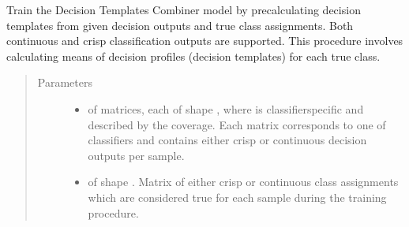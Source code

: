 \documentclass[letterpaper,10pt,english]{sphinxmanual}
\begin{document}
\begin{fulllineitems}
\begin{fulllineitems}
\label{\detokenize{pusion.core.decision_templates_combiner:pusion.core.decision_templates_combiner.CRDecisionTemplatesCombiner.train}}
\sphinxAtStartPar
Train the Decision Templates Combiner model by precalculating decision templates from given decision outputs and
true class assignments. Both continuous and crisp classification outputs are supported. This procedure involves
calculating means of decision profiles (decision templates) for each true class.
\begin{quote}\begin{description}
\item[{Parameters}] \leavevmode\begin{itemize}
\item {} 
\sphinxAtStartPar
{} \textendash{}  of  matrices, each of shape ,
where  is classifier\sphinxhyphen{}specific and described by the coverage.
Each matrix corresponds to one of  classifiers and contains either crisp or continuous
decision outputs per sample.

\item {} 
\sphinxAtStartPar
{} \textendash{}  of shape .
Matrix of either crisp or continuous class assignments which are considered true for each sample during
the training procedure.

\end{itemize}

\end{description}\end{quote}

\end{fulllineitems}



\end{fulllineitems}
\end{document}
